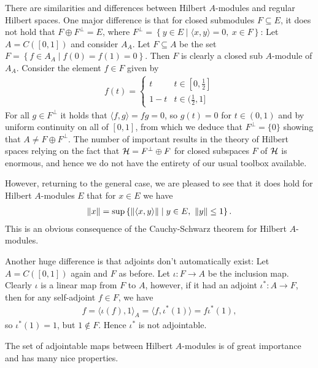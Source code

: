 \begin{note}
	There are similarities and differences between Hilbert $A$-modules and regular Hilbert spaces. One major difference is that for closed submodules $F\subseteq E$, it does not hold that $F \oplus F^\perp=E$, where $F^\perp = \left\{ y \in E \mid \langle x,y\rangle = 0, \ x \in F \right\}$: Let $A=C([0,1])$ and consider $A_A$. Let $F\subseteq A$ be the set $F = \left\{f \in A_A \mid f(0)=f(1)=0  \right\}$. Then $F$ is clearly a closed sub $A$-module of $A_A$. Consider the element $f \in F$ given by
	\begin{align*}
		f(t) = \begin{cases}
			t & t \in [0,\frac12]\\
		1-t & t \in (\frac12,1]
		\end{cases}
	\end{align*}
	For all $g \in F^\perp$ it holds that $\langle f,g\rangle = fg = 0$, so $g(t)=0$ for $t \in (0,1)$ and by uniform continuity on all of $[0,1]$, from which we deduce that $F^\perp = \{0\}$ showing that $A \neq F \oplus F^\perp$. The number of important results in the theory of Hilbert spaces relying on the fact that $\mathcal{H} =  F^\perp \oplus F$ for closed subspaces $F$ of $\mathcal{H}$ is enormous, and hence we do not have the entirety of our usual toolbox available. 

	However, returning to the general case, we are pleased to see that it does hold for Hilbert $A$-modules $E$ that for $x \in E$ we have
	\begin{align*}
		\left\lVert x \right\rVert = \sup\left\{ \left\lVert \langle x , y \rangle \right\rVert \mid y \in E, \ \left\lVert y \right\rVert \leq 1 \right\}.
	\end{align*}
	This is an obvious consequence of the Cauchy-Schwarz theorem for Hilbert $A$-modules. 

	Another huge difference is that adjoints don't automatically exist: Let $A = C([0,1])$ again and $F$ as before. Let $ \iota \colon F \to A$ be the inclusion map. Clearly $\iota$ is a linear map from $F$ to $A$, however, if it had an adjoint $\iota^* \colon A \to F$, then for any self-adjoint $f \in F$, we have
	\begin{align*}
		 f = \langle \iota(f) , 1 \rangle_A = \langle f , \iota^*(1)\rangle = f \iota^*(1),
	\end{align*}
	so $\iota^*(1)=1$, but $1 \not\in F$. Hence $\iota^*$ is not adjointable.
\end{note}
The set of adjointable maps between Hilbert $A$-modules is of great importance and has many nice properties.
